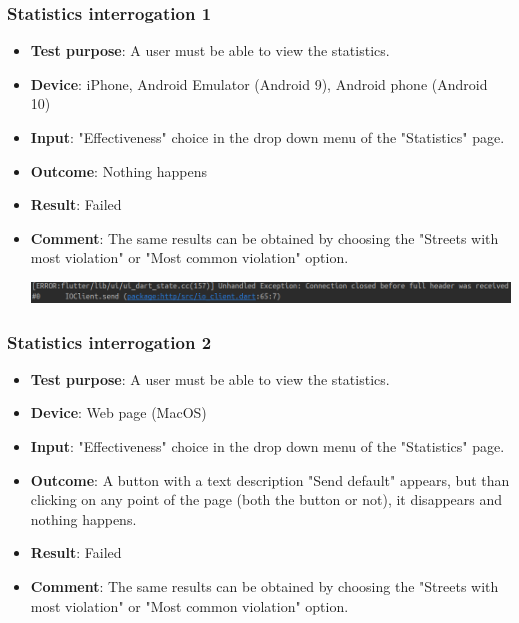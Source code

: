 \documentclass[../ATD.tex]{subfiles}
\begin{document}
    \subsubsection{Statistics interrogation 1}\label{subsubsec:statistics-interrogation-1}
    \begin{itemize}
        \item \textbf{Test purpose}: A user must be able to view the statistics.
        \item \textbf{Device}: iPhone, Android Emulator (Android 9), Android phone (Android 10)
        \item \textbf{Input}: "Effectiveness" choice in the drop down menu of the "Statistics" page.
        \item \textbf{Outcome}: Nothing happens
        \item \textbf{Result}: Failed
        \item \textbf{Comment}: The same results can be obtained by choosing the "Streets with most violation" or "Most common violation" option.

        \includegraphics[scale = 0.4]{assets/statsError.png}
    \end{itemize}

    \subsubsection{Statistics interrogation 2}\label{subsec:statistics-interrogation-2}
    \begin{itemize}
        \item \textbf{Test purpose}: A user must be able to view the statistics.
        \item \textbf{Device}: Web page (MacOS)
        \item \textbf{Input}: "Effectiveness" choice in the drop down menu of the "Statistics" page.
        \item \textbf{Outcome}: A button with a text description "Send default" appears, but than clicking on any point of the page (both the button or not), it disappears and nothing happens.
        \item \textbf{Result}: Failed
        \item \textbf{Comment}: The same results can be obtained by choosing the "Streets with most violation" or "Most common violation" option.
    \end{itemize}
\end{document}
